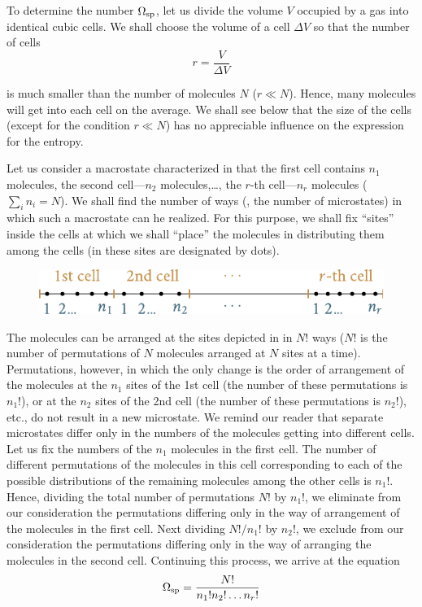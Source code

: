 To determine the number $\Omega_{\text{sp}}$, let us divide the volume $V$ occupied by a gas into identical cubic cells. We shall choose the volume of a cell $\Delta V$ so that the number of cells
\begin{equation}\label{eq:11_97}
	r = \frac{V}{\Delta V}
\end{equation}

\noindent
is much smaller than the number of molecules $N$ ($r\ll N$). Hence, many molecules will get into each cell on the average. We shall see below that the size of the cells (except for the condition $r\ll N$) has no appreciable influence on the expression for the entropy.

Let us consider a macrostate characterized in that the first cell contains $n_1$ molecules, the second cell---$n_2$ molecules,\ldots, the $r$-th cell---$n_r$ molecules ($\sum_in_i=N$). We shall find the number of ways (\ie, the number of microstates) in which such a macrostate can he realized. For this purpose, we shall fix ``sites'' inside the cells at which we shall ``place'' the molecules in distributing them among the cells (in  these sites are designated by dots).

\begin{figure}[t]
	\begin{center}
		\includegraphics[scale=1.0]{figures/ch_11/fig_11_26.pdf}
		\caption[]{}
		\label{fig:11_26}
	\end{center}
	\vspace{-0.8cm}
\end{figure}

The molecules can be arranged at the sites depicted in  in $N!$ ways ($N!$ is the number of permutations of $N$ molecules arranged at $N$ sites at a time). Permutations, however, in which the only change is the order of arrangement of the molecules at the $n_1$ sites of the 1st cell (the number of these permutations is $n_1!$), or at the $n_2$ sites of the 2nd cell (the number of these permutations is $n_2!$), etc., do not result in a new microstate. We remind our reader that separate microstates differ only in the numbers of the molecules getting into different cells. Let us fix the numbers of the $n_1$ molecules in the first cell. The number of different permutations of the molecules in this cell corresponding to each of the possible distributions of the remaining molecules among the other cells is $n_1!$. Hence, dividing the total number of permutations $N!$ by $n_1!$, we eliminate from our consideration the permutations differing only in the way of arrangement of the molecules in the first cell. Next dividing $N!/n_1!$ by $n_2!$, we exclude from our consideration the permutations differing only in the way of arranging the molecules in the second cell. Continuing this process, we arrive at the equation
\begin{equation}\label{eq:11_98}
	\Omega_{\text{sp}} = \frac{N!}{n_1! n_2! \ldots n_r!}
\end{equation}

